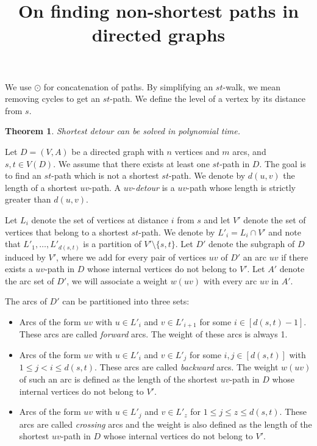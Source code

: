 \documentclass[utf8,11pt]{article}
\title{On finding non-shortest paths in directed graphs}
\author{}
\date{}
\theoremstyle{plain}
\newtheorem{theorem}{Theorem}
\theoremstyle{definition}
\begin{document}
\maketitle 

We use $\odot$ for concatenation of paths. By simplifying an $st$-walk, we mean removing cycles to get an $st$-path. We define the level of a vertex by its distance from $s$.

\begin{theorem}\label{proof:main} 
   Shortest detour can be solved in polynomial time. 
\end{theorem}

Let $D = (V,A)$ be a directed graph with $n$ vertices and $m$ arcs, and $s,t \in V(D)$. We assume that there exists at least one $st$-path in $D$. The goal is to find an $st$-path which is not a shortest $st$-path. We denote by $d(u,v)$ the length of a shortest $uv$-path. A $uv$-\textit{detour} is a $uv$-path whose length is strictly greater than $d(u,v)$.

Let $L_i$ denote the set of vertices at distance $i$ from $s$ and let $V'$ denote the set of vertices that belong to a shortest $st$-path. We denote by $L'_i = L_i \cap V'$ and note that $L'_1, \dots, L'_{d(s,t)}$ is a partition of $V' \setminus \{s,t\}$. Let $D'$ denote the subgraph of $D$ induced by $V'$, where we add for every pair of vertices $uv$ of $D'$ an arc $uv$ if there exists a $uv$-path in $D$ whose internal vertices do not belong to $V'$. Let $A'$ denote the arc set of $D'$, we will associate a weight $w(uv)$ with every arc $uv$ in $A'$. 

The arcs of $D'$ can be partitioned into three sets: 
\begin{itemize}
    \item Arcs of the form $uv$ with $u \in L'_{i}$ and $v \in L'_{i+1}$ for some $i \in [d(s,t)-1]$. These arcs are called \textit{forward} arcs. The weight of these arcs is always 1.
    \item Arcs of the form $uv$ with $u \in L'_{i}$ and $v \in L'_{j}$ for some $i,j \in [d(s,t)]$ with $1 \leq j < i \leq d(s,t)$. These arcs are called \textit{backward} arcs. The weight $w(uv)$ of such an arc is defined as the length of the shortest $uv$-path in $D$ whose internal vertices do not belong to $V'$. 
    \item Arcs of the form $uv$ with $u \in L'_{j}$ and $v \in L'_{z}$ for $1 \leq j \leq z \leq d(s,t)$. These arcs are called \textit{crossing} arcs and the weight is also defined as the length of the shortest $uv$-path in $D$ whose internal vertices do not belong to $V'$.
\end{itemize}
\end{document}
